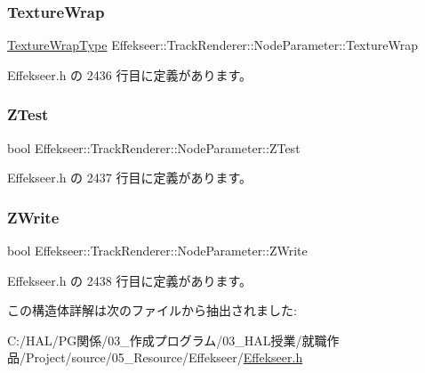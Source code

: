 \subsubsection{\texorpdfstring{Texture\+Wrap}{TextureWrap}}
{\footnotesize\ttfamily \mbox{\hyperlink{namespace_effekseer_a5320c83784602974b6278bf1a77b58a3}{Texture\+Wrap\+Type}} Effekseer\+::\+Track\+Renderer\+::\+Node\+Parameter\+::\+Texture\+Wrap}



 Effekseer.\+h の 2436 行目に定義があります。

\mbox{\label{struct_effekseer_1_1_track_renderer_1_1_node_parameter_a28fd38571670062a60b8ea12128c9ff7}} 
\subsubsection{\texorpdfstring{Z\+Test}{ZTest}}
{\footnotesize\ttfamily bool Effekseer\+::\+Track\+Renderer\+::\+Node\+Parameter\+::\+Z\+Test}



 Effekseer.\+h の 2437 行目に定義があります。

\mbox{\label{struct_effekseer_1_1_track_renderer_1_1_node_parameter_aee94934faee558a0c2ee1750b1e1051b}} 
\subsubsection{\texorpdfstring{Z\+Write}{ZWrite}}
{\footnotesize\ttfamily bool Effekseer\+::\+Track\+Renderer\+::\+Node\+Parameter\+::\+Z\+Write}



 Effekseer.\+h の 2438 行目に定義があります。



この構造体詳解は次のファイルから抽出されました\+:\begin{DoxyCompactItemize}
\item 
C\+:/\+H\+A\+L/\+P\+G関係/03\+\_\+作成プログラム/03\+\_\+\+H\+A\+L授業/就職作品/\+Project/source/05\+\_\+\+Resource/\+Effekseer/\mbox{\hyperlink{_effekseer_8h}{Effekseer.\+h}}\end{DoxyCompactItemize}
